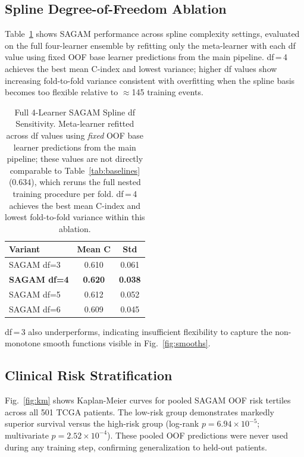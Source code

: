 \documentclass[conference]{IEEEtran}
\begin{document}
\subsection{Spline Degree-of-Freedom Ablation}

Table~\ref{tab:df_ablation} shows SAGAM performance across spline complexity
settings, evaluated on the full four-learner ensemble by refitting only
the meta-learner with each df value using fixed OOF base learner predictions
from the main pipeline.
df\,=\,4 achieves the best mean C-index and lowest variance; higher df values
show increasing fold-to-fold variance consistent with overfitting when the
spline basis becomes too flexible relative to $\approx$145 training events.

\begin{table}[t]
\caption{Full 4-Learner SAGAM Spline df Sensitivity. Meta-learner refitted
across df values using \emph{fixed} OOF base learner predictions from the
main pipeline; these values are not directly comparable to Table~\ref{tab:baselines}
(0.634), which reruns the full nested training procedure per fold.
df\,=\,4 achieves the best mean C-index and lowest fold-to-fold variance
within this ablation.}
\label{tab:df_ablation}
\begin{center}
\begin{tabular}{lcc}
\toprule
\textbf{Variant} & \textbf{Mean C} & \textbf{Std} \\
\midrule
SAGAM df=3 & 0.610 & 0.061 \\
\textbf{SAGAM df=4} & \textbf{0.620} & \textbf{0.038} \\
SAGAM df=5 & 0.612 & 0.052 \\
SAGAM df=6 & 0.609 & 0.045 \\
\bottomrule
\end{tabular}
\end{center}
\end{table}

df\,=\,3 also underperforms, indicating insufficient flexibility to capture the
non-monotone smooth functions visible in Fig.~\ref{fig:smooths}.

\subsection{Clinical Risk Stratification}

Fig.~\ref{fig:km} shows Kaplan-Meier curves for pooled SAGAM OOF risk
tertiles across all 501 TCGA patients.
The low-risk group demonstrates markedly superior survival versus the
high-risk group (log-rank $p = 6.94 \times 10^{-5}$; multivariate
$p = 2.52 \times 10^{-4}$).
These pooled OOF predictions were never used during any training step,
confirming generalization to held-out patients.
\end{document}
